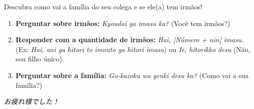 \documentclass[12pt,a4paper]{article}
\begin{document}
\vspace{0.5cm}

\begin{tcolorbox}[colback=jppurple!6, colframe=jppurple, title=\textbf{Dinâmica em Grupo (Prática Presencial)}, fonttitle=\bfseries]
\small
Descubra como vai a família do seu colega e se ele(a) tem irmãos!

\vspace{0.2cm}

\begin{enumerate}[leftmargin=*]
    \item \textbf{Perguntar sobre irmãos:} \textit{Kyoudai ga imasu ka?} (Você tem irmãos?)
    \item \textbf{Responder com a quantidade de irmãos:} \textit{Hai, [Número + nin] imasu.} (Ex: \textit{Hai, ani ga hitori to imouto ga hitori imasu}) ou \textit{Ie, hitorikko desu} (Não, sou filho único).
    \item \textbf{Perguntar sobre a família:} \textit{Go-kazoku wa genki desu ka?} (Como vai a sua família?)
\end{enumerate}
\end{tcolorbox}

\vspace{0.4cm}

\begin{center}
    \small\color{gray} \textit{お疲れ様でした！}
\end{center}
\end{document}
